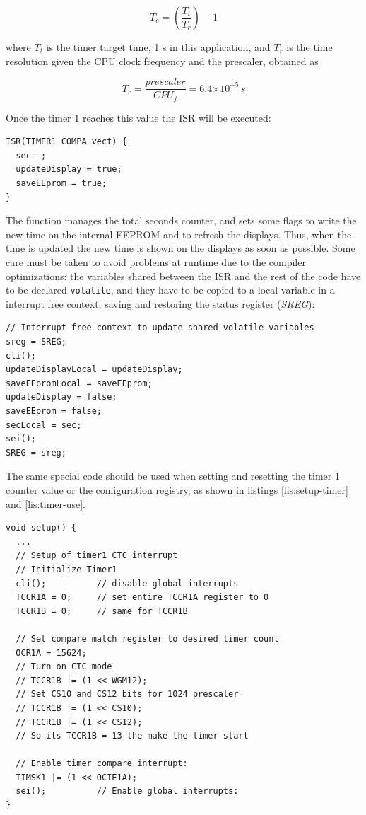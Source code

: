 \documentclass[11pt,english]{article}
\providecommand{\e}[1]{\ensuremath{\times 10^{#1}}}
\newcommand{\code}[1]{\texttt{#1}}
\begin{document}
\[
 T_c = \left(  \frac{T_t}{T_r} \right) - 1 
\]

where $T_t$ is the timer target time, 1 s in this application, and $T_r$ is the time resolution given the CPU 
clock frequency and the prescaler, obtained as

\[
 T_r = \frac{prescaler}{CPU_f} = 6.4\e{-5} \, s
\]
 
Once the timer 1 reaches this value the ISR will be executed: 

%
\begin{lstlisting}[label=lis:timer-ISR,caption=Interrupt Service Routine]
ISR(TIMER1_COMPA_vect) {
  sec--;
  updateDisplay = true;
  saveEEprom = true;
}
\end{lstlisting}

The function manages the total seconds counter, and sets some flags to write the new time on the 
internal EEPROM and to refresh the displays. Thus, when the time is updated the new time is shown on the 
displays as soon as possible. 
Some care must be taken to avoid problems at runtime due to the compiler optimizations: the variables shared 
between the ISR and the rest of the code have to be declared \code{volatile}, and they have to be copied to 
a local variable in a interrupt free context, saving and restoring the status register (\emph{SREG}): 

%
\begin{lstlisting}[label=lis:main-timer,caption=Read shared variables in the main program ]
// Interrupt free context to update shared volatile variables
sreg = SREG;
cli();
updateDisplayLocal = updateDisplay;
saveEEpromLocal = saveEEprom;
updateDisplay = false;
saveEEprom = false;
secLocal = sec;
sei();
SREG = sreg;
\end{lstlisting}

The same special code should be used when setting and resetting the timer 1 counter value or the configuration 
registry, as shown in listings \ref{lis:setup-timer} and \ref{lis:timer-use}.

%
\begin{lstlisting}[label=lis:setup-timer,caption=Setup of the timer interrupt]
void setup() {
  ...
  // Setup of timer1 CTC interrupt
  // Initialize Timer1
  cli();          // disable global interrupts
  TCCR1A = 0;     // set entire TCCR1A register to 0
  TCCR1B = 0;     // same for TCCR1B

  // Set compare match register to desired timer count
  OCR1A = 15624;
  // Turn on CTC mode
  // TCCR1B |= (1 << WGM12);
  // Set CS10 and CS12 bits for 1024 prescaler
  // TCCR1B |= (1 << CS10);
  // TCCR1B |= (1 << CS12);
  // So its TCCR1B = 13 the make the timer start

  // Enable timer compare interrupt:
  TIMSK1 |= (1 << OCIE1A);
  sei();          // Enable global interrupts:
}
\end{lstlisting}
\end{document}
